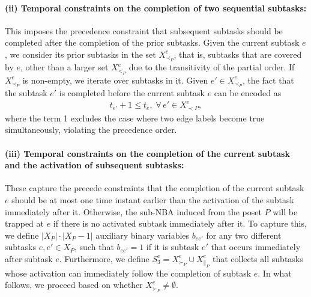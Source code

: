 \documentclass[Afour,sageh,times]{sagej}
\newcounter{mycounter}
\begin{document}
{{{{{\paragraph{(ii) Temporal constraints on the completion of two sequential subtasks:}\label{sec:constraintonedge}
This imposes the precedence constraint that subsequent subtasks should be completed after the completion of the prior subtasks.   Given the current subtask $e$, we consider its prior subtasks in the set $X^e_{\prec_{P}}$, that is, subtasks that are covered by $e$, other than a larger set $X^e_{<_{P}}$ due to the transitivity of the partial order.
If $X^e_{\prec_{P}}$ is non-empty, we iterate over subtasks in it.  Given $e' \in X^e_{\prec_{P}}$, the fact that the subtask $e'$ is completed before the current subtask $e$ can be encoded as
\begingroup\makeatletter\def\f@size{10}\check@mathfonts
\def\maketag@@@#1{\hbox{\m@th\normalsize\normalfont#1}}%
\begin{align}\label{eq:12}
  t_{e'} +  1  \leq t_e, \; \forall \, e' \in X_{\prec P}^e,
\end{align}
\endgroup
where the term 1 excludes the case where two edge labels become true simultaneously, violating the precedence order.

\paragraph{(iii)  Temporal constraints on  the  completion of the current subtask and the activation  of subsequent subtasks:}
These capture the precede constraints that the completion of the current subtask $e$ should be at most one time instant earlier than the activation of the subtask immediately after it. Otherwise, the sub-NBA induced from the poset $P$ will be trapped at $e$ if there is no activated subtask immediately after it. To capture this, we define $|X_P|\cdot |X_P -1|$ auxiliary binary variables $b_{ee'}$ for any two different subtasks  $e, e' \in X_P$,  such that $b_{ee'}=1$  if it is subtask $e'$ that occurs immediately after subtask $e$. Furthermore, we define  $S_3^e = X^e_{\succ_{P}} \cup X^e_{\|_{P}}$ that collects all subtasks whose activation can immediately follow the completion of subtask $e$.  In what follows, we proceed based on whether $ X^e_{\succ_{P}} \neq \emptyset$.
}}}}}
\end{document}
